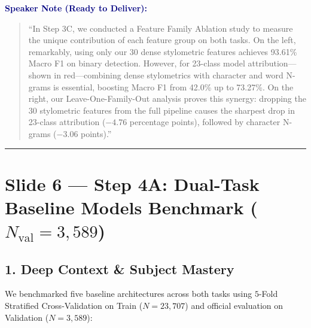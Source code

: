 \documentclass[11pt, a4paper]{article}
\newenvironment{speakernote}{%
    \par\vspace{0.2cm}%
    \noindent\textbf{\textcolor{navy}{Speaker Note (Ready to Deliver):}}\par\vspace{0.1cm}%
    \begin{quote}\itshape\color{slate}%
}{%
    \end{quote}\vspace{0.2cm}%
}
\begin{document}
\begin{speakernote}
``In Step 3C, we conducted a Feature Family Ablation study to measure the unique contribution of each feature group on both tasks. On the left, remarkably, using only our 30 dense stylometric features achieves 93.61\% Macro F1 on binary detection. However, for 23-class model attribution---shown in red---combining dense stylometrics with character and word N-grams is essential, boosting Macro F1 from 42.0\% up to 73.27\%. On the right, our Leave-One-Family-Out analysis proves this synergy: dropping the 30 stylometric features from the full pipeline causes the sharpest drop in 23-class attribution ($-4.76$ percentage points), followed by character N-grams ($-3.06$ points).''
\end{speakernote}

\vspace{0.3cm}\hrule\vspace{0.3cm}

\section{Slide 6 --- Step 4A: Dual-Task Baseline Models Benchmark ($N_{\text{val}} = 3,589$)}

\subsection*{1. Deep Context \& Subject Mastery}
We benchmarked five baseline architectures across both tasks using $5$-Fold Stratified Cross-Validation on Train ($N = 23,707$) and official evaluation on Validation ($N = 3,589$):
\end{document}
